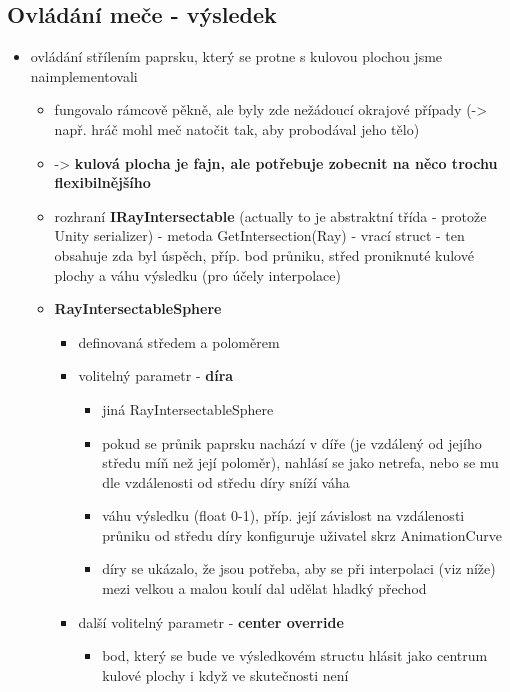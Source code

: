 \subsection{Ovládání meče - výsledek}
\begin{itemize}
    \item ovládání střílením paprsku, který se protne s kulovou plochou jsme naimplementovali
        \begin{itemize}
            \item fungovalo rámcově pěkně, ale byly zde nežádoucí okrajové případy (-> např. hráč mohl meč natočit tak, aby probodával jeho tělo)
            \item -> \textbf{kulová plocha je fajn, ale potřebuje zobecnit na něco trochu flexibilnějšího}
            \item rozhraní \textbf{IRayIntersectable} (actually to je abstraktní třída - protože Unity serializer) - metoda GetIntersection(Ray) - vrací struct - ten obsahuje zda byl úspěch, příp. bod průniku, střed proniknuté kulové plochy a váhu výsledku (pro účely interpolace)
            \item \textbf{RayIntersectableSphere}
                \begin{itemize}
                    \item definovaná středem a poloměrem
                    \item volitelný parametr - \textbf{díra}
                        \begin{itemize}
                            \item jiná RayIntersectableSphere
                            \item pokud se průnik paprsku nachází v díře (je vzdálený od jejího středu míň než její poloměr), nahlásí se jako netrefa, nebo se mu dle vzdálenosti od středu díry sníží váha
                            \item váhu výsledku (float 0-1), příp. její závislost na vzdálenosti průniku od středu díry konfiguruje uživatel skrz AnimationCurve
                            \item díry se ukázalo, že jsou potřeba, aby se při interpolaci (viz níže) mezi velkou a malou koulí dal udělat hladký přechod
                        \end{itemize}
                    \item další volitelný parametr - \textbf{center override}
                    \begin{itemize}
                        \item bod, který se bude ve výsledkovém structu hlásit jako centrum kulové plochy i když ve skutečnosti není

\end{itemize}
\end{itemize}
\end{itemize}
\end{itemize}
